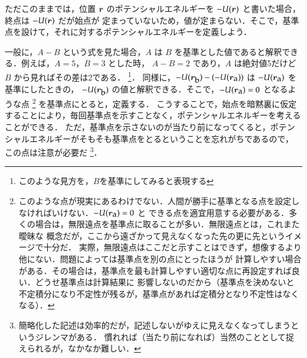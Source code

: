                                         ただこのままでは，位置 $\boldsymbol{r}$ のポテンシャルエネルギーを $-U(\boldsymbol{r})$ と書いた場合，終点は $-U(\boldsymbol{r})$ だが始点が
                                        定まっていないため，値が定まらない．そこで，基準点を設けて，それに対するポテンシャルエネルギーを定義しよう．

                                        一般に，$A-B$ という式を見た場合，$A$ は $B$ を基準とした値であると解釈できる．例えば，$A=5$，$B=3$ とした時，
                                        $A-B=2$ であり，$A$ は絶対値5だけど $B$ から見ればその差は2である．
                                                \footnote{
                                                        このような見方を，$B$を基準にしてみると表現する
                                                }．
                                    同様に，$- U(\boldsymbol{r}_{\mbox{b}}) - ( - U(\boldsymbol{r}_{\mbox{a}}) )$ は $- U(\boldsymbol{r}_{\mbox{a}})$ を基準にしたときの，
                                    $- U(\boldsymbol{r}_{\mbox{b}})$ の値と解釈できる．そこで，$- U(\boldsymbol{r}_{\mbox{a}})=0$ となるような点
                                        \footnote{
                                                このような点が現実にあるわけでない．人間が勝手に基準となる点を設定しなければいけない．$- U(\boldsymbol{r}_{\mbox{a}})=0$ と
                                                できる点を適宜用意する必要がある．多くの場合は，無限遠点を基準点に取ることが多い．無限遠点とは，これまた曖昧な
                                                概念だが，ここから遠ざかって見えなくなった先の更に先というイメージで十分だ．
                                                実際，無限遠点はここだと示すことはできず，想像するより他にない．問題によっては基準点を別の点にとったほうが
                                                計算しやすい場合がある．その場合は，基準点を最も計算しやすい適切な点に再設定すれば良い．どうせ基準点は計算結果に
                                                影響しないのだから（基準点を決めないと不定積分になり不定性が残るが，基準点があれば定積分となり不定性はなくなる）．
                                        }
                                    を基準点にとると，定義する．
                                    こうすることで，始点を暗黙裏に仮定することにより，毎回基準点を示すことなく，ポテンシャルエネルギーを考えることができる．
                                    ただ，基準点を示さないのが当たり前になってくると，ポテンシャルエネルギーがそもそも基準点をとるということを忘れがちであるので，
                                    この点は注意が必要だ
                                        \footnote{
                                                簡略化した記述は効率的だが，記述しないがゆえに見えなくなってしまうというジレンマがある．
                                                慣れれば（当たり前になれば）当然のこととして捉えられるが，なかなか難しい．
                                        }．
